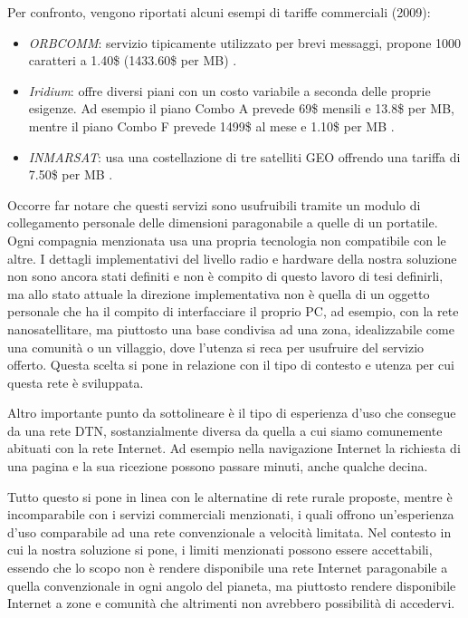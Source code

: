 \documentclass[12pt,a4paper,oneside]{book}
\begin{document}
		Per confronto, vengono riportati alcuni esempi di tariffe commerciali (2009):
		\begin{itemize}
			\item {\it ORBCOMM}: servizio tipicamente utilizzato per brevi messaggi, propone 1000 caratteri a 1.40\$ (1433.60\$ per MB) \cite{orbcomm}.
			\item {\it Iridium}: offre diversi piani con un costo variabile a seconda delle proprie esigenze. Ad esempio il piano Combo A prevede 69\$ mensili e 13.8\$ per MB, mentre il piano Combo F prevede 1499\$ al mese e 1.10\$ per MB \cite{iridium}.
			\item {\it INMARSAT}: usa una costellazione di tre satelliti GEO offrendo una tariffa di 7.50\$ per MB \cite{inmarsat}.
		\end{itemize}
		Occorre far notare che questi servizi sono usufruibili tramite un modulo di collegamento personale delle dimensioni paragonabile a quelle di un portatile. Ogni compagnia menzionata usa una propria tecnologia non compatibile con le altre. I dettagli implementativi del livello radio e hardware della nostra soluzione non sono ancora stati definiti e non è compito di questo lavoro di tesi definirli, ma allo stato attuale la direzione implementativa non è quella di un oggetto personale che ha il compito di interfacciare il proprio PC, ad esempio, con la rete nanosatellitare, ma piuttosto una base condivisa ad una zona, idealizzabile come una comunità o un villaggio, dove l'utenza si reca per usufruire del servizio offerto. Questa scelta si pone in relazione con il tipo di contesto e utenza per cui questa rete è sviluppata. 
		
		Altro importante punto da sottolineare è il tipo di esperienza d'uso che consegue da una rete DTN, sostanzialmente diversa da quella a cui siamo comunemente abituati con la rete Internet. Ad esempio nella navigazione Internet la richiesta di una pagina e la sua ricezione possono passare minuti, anche qualche decina. 
		
		Tutto questo si pone in linea con le alternatine di rete rurale proposte, mentre è incomparabile con i servizi commerciali menzionati, i quali offrono un'esperienza d'uso comparabile ad una rete convenzionale a velocità limitata. Nel contesto in cui la nostra soluzione si pone, i limiti menzionati possono essere accettabili, essendo che lo scopo non è rendere disponibile una rete Internet paragonabile a quella convenzionale in ogni angolo del pianeta, ma piuttosto rendere disponibile Internet a zone e comunità che altrimenti non avrebbero possibilità di accedervi.
		
\end{document}
